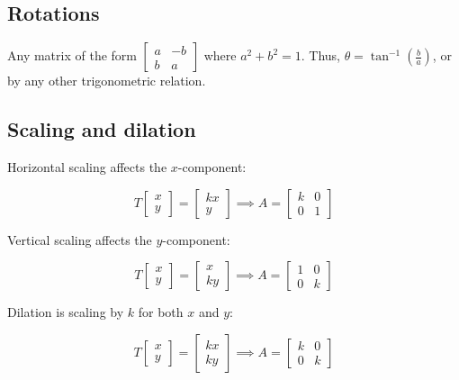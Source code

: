 \subsection{Rotations}

Any matrix of the form $\begin{bmatrix}a&-b\\b&a\end{bmatrix}$ where $a^2+b^2=1$. 
Thus, $\theta=\tan^{-1}(\frac{b}{a})$, or by any other trigonometric relation.

\subsection{Scaling and dilation}

Horizontal scaling affects the $x$-component:

\[
    T \begin{bmatrix}x\\ y\end{bmatrix}
    =
    \begin{bmatrix}kx\\ y\end{bmatrix}
    \implies
    A=
    \begin{bmatrix}k&0\\ 0&1\end{bmatrix}
\]

Vertical scaling affects the $y$-component:

\[
    T \begin{bmatrix}x\\ y\end{bmatrix}
    =
    \begin{bmatrix}x\\ ky\end{bmatrix}
    \implies
    A=
    \begin{bmatrix}1&0\\ 0&k\end{bmatrix}  
\]

Dilation is scaling by $k$ for both $x$ and $y$:

\[
    T \begin{bmatrix}x\\ y\end{bmatrix}
    =
    \begin{bmatrix}kx\\ ky\end{bmatrix}
    \implies
    A=
    \begin{bmatrix}k&0\\ 0&k\end{bmatrix}  
\]


